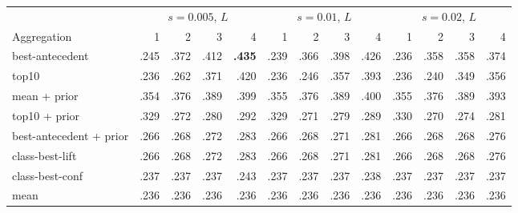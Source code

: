 \begin{tabular}{@{}l|rrrr|rrrr|rrrr@{}}
\toprule
 & \multicolumn{4}{c|}{$s=0.005$, $L$} & \multicolumn{4}{c|}{$s=0.01$, $L$} & \multicolumn{4}{c}{$s=0.02$, $L$} \\ Aggregation & 1 & 2 & 3 & 4 & 1 & 2 & 3 & 4 & 1 & 2 & 3 & 4 \\
\midrule
best-antecedent & .245 & .372 & .412 & \textbf{.435} & .239 & .366 & .398 & .426 & .236 & .358 & .358 & .374 \\
top10 & .236 & .262 & .371 & .420 & .236 & .246 & .357 & .393 & .236 & .240 & .349 & .356 \\
mean + prior & .354 & .376 & .389 & .399 & .355 & .376 & .389 & .400 & .355 & .376 & .389 & .393 \\
top10 + prior & .329 & .272 & .280 & .292 & .329 & .271 & .279 & .289 & .330 & .270 & .274 & .281 \\
best-antecedent + prior & .266 & .268 & .272 & .283 & .266 & .268 & .271 & .281 & .266 & .268 & .268 & .276 \\
class-best-lift & .266 & .268 & .272 & .283 & .266 & .268 & .271 & .281 & .266 & .268 & .268 & .276 \\
class-best-conf & .237 & .237 & .237 & .243 & .237 & .237 & .237 & .238 & .237 & .237 & .237 & .237 \\
mean & .236 & .236 & .236 & .236 & .236 & .236 & .236 & .236 & .236 & .236 & .236 & .236 \\
\bottomrule
\end{tabular}

